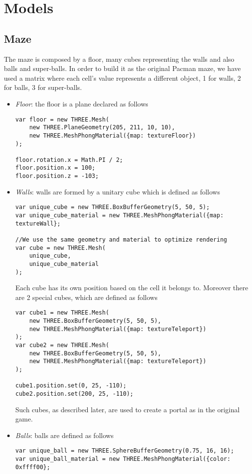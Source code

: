 \documentclass[a4paper,oneside]{report}
\begin{document}
\chapter{Models}
\section{Maze}
The maze is composed by a floor, many cubes representing the walls and also balls and super-balls. In order to build it as the original Pacman maze, we have used a matrix where each cell's value represents a different object, 1 for walls, 2 for balls, 3 for super-balls.
\begin{itemize}
\item \textit{Floor}: the floor is a plane declared as follows
\begin{lstlisting}
var floor = new THREE.Mesh(
	new THREE.PlaneGeometry(205, 211, 10, 10),
	new THREE.MeshPhongMaterial({map: textureFloor})
);

floor.rotation.x = Math.PI / 2;
floor.position.x = 100;
floor.position.z = -103;
\end{lstlisting}

\item \textit{Walls}: walls are formed by a unitary cube which is defined as follows
\begin{lstlisting}
var unique_cube = new THREE.BoxBufferGeometry(5, 50, 5);
var unique_cube_material = new THREE.MeshPhongMaterial({map: textureWall};

//We use the same geometry and material to optimize rendering
var cube = new THREE.Mesh(
	unique_cube,
	unique_cube_material
);

\end{lstlisting}
Each cube has its own position based on the cell it belongs to. Moreover there are 2 special cubes, which are defined as follows
\begin{lstlisting}
var cube1 = new THREE.Mesh(
	new THREE.BoxBufferGeometry(5, 50, 5),
	new THREE.MeshPhongMaterial({map: textureTeleport})
);
var cube2 = new THREE.Mesh(
	new THREE.BoxBufferGeometry(5, 50, 5),
	new THREE.MeshPhongMaterial({map: textureTeleport})
);

cube1.position.set(0, 25, -110);
cube2.position.set(200, 25, -110);
\end{lstlisting}

Such cubes, as described later, are used to create a portal as in the original game.

\item \textit{Balls}: balls are defined as follows
\begin{lstlisting}
var unique_ball = new THREE.SphereBufferGeometry(0.75, 16, 16);
var unique_ball_material = new THREE.MeshPhongMaterial({color: 0xffff00};


\end{lstlisting}
\end{itemize}
\end{document}
